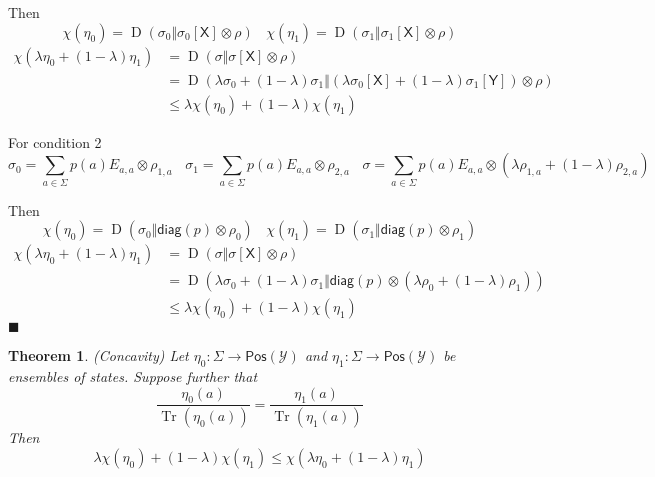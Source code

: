 \documentclass[aps,pra,onecolumn,notitlepage,superscriptaddress]{revtex4-1}
\newcommand{\reg}[1]{\mathsf{#1}}
\newcommand{\spc}[1]{\mathcal{#1}}
\newcommand{\Pos}{\mathsf{Pos}}
\newcommand{\Tr}{\operatorname{Tr}}
\newcommand{\diag}{\mathsf{diag}}
\newcommand{\op}[1]{\operatorname{#1}}
\newtheorem{theo}{Theorem}
\def\qed{$\blacksquare$ \newline}
\begin{document}
    Then
    \begin{equation}
        \chi(\eta_0) = \op D(\sigma_0 \Vert \sigma_0[\reg X] \otimes \rho) \ \ \ \
        \chi(\eta_1) = \op D(\sigma_1 \Vert \sigma_1[\reg X] \otimes \rho)
    \end{equation}
    \begin{align*}
        \chi(\lambda \eta_0 + (1-\lambda)\eta_1) &= \op D(\sigma \Vert \sigma[\reg X] \otimes \rho) \\
        &= \op D(\lambda\sigma_0 + (1-\lambda)\sigma_1 \Vert (\lambda\sigma_0[\reg X] + (1-\lambda)\sigma_1[\reg Y]) \otimes \rho) \\
        &\leq \lambda \chi(\eta_0) + (1-\lambda) \chi(\eta_1)
    \end{align*}

    For condition 2
    \begin{equation}
        \sigma_0 = \sum_{a \in \Sigma} p(a) E_{a,a} \otimes \rho_{1,a} \ \ \ \ 
        \sigma_1 = \sum_{a \in \Sigma} p(a) E_{a,a} \otimes \rho_{2,a} \ \ \ \
        \sigma = \sum_{a \in \Sigma} p(a) E_{a,a} \otimes (\lambda\rho_{1,a} + (1-\lambda)\rho_{2,a})
    \end{equation}

    Then
    \begin{equation}
        \chi(\eta_0) = \op D(\sigma_0 \Vert \diag(p) \otimes \rho_0) \ \ \ \
        \chi(\eta_1) = \op D(\sigma_1 \Vert \diag(p) \otimes \rho_1)
    \end{equation}        
    \begin{align*}
        \chi(\lambda \eta_0 + (1-\lambda)\eta_1) &= \op D(\sigma \Vert \sigma[\reg X] \otimes \rho) \\
        &= \op D(\lambda\sigma_0 + (1-\lambda)\sigma_1 \Vert \diag(p) \otimes (\lambda\rho_0 + (1-\lambda)\rho_1)) \\
        &\leq \lambda \chi(\eta_0) + (1-\lambda) \chi(\eta_1)
    \end{align*}
    \qed

    \begin{theo}
        (Concavity) Let $\eta_0 : \Sigma \to \Pos(\spc Y)$ and $\eta_1 : \Sigma \to \Pos(\spc Y)$ be ensembles of states. Suppose further that
        \begin{equation}
            \frac{\eta_0(a)}{\Tr(\eta_0(a))} = \frac{\eta_1(a)}{\Tr(\eta_1(a))}
        \end{equation}
        Then
        \begin{equation}
            \lambda \chi(\eta_0) + (1-\lambda) \chi(\eta_1) \leq \chi(\lambda \eta_0 + (1-\lambda) \eta_1)
        \end{equation}
    \end{theo}
\end{document}
